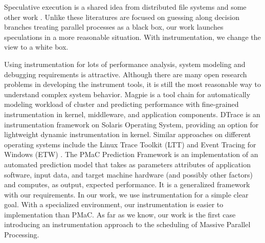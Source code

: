 Speculative execution is a shared idea from distributed file systems
\cite{Nightingale:2006:SED:1189256.1189258} and some other work
\cite{Su:2007:AIC:1294261.1294284} . Unlike these literatures are focused on guessing
along decision branches treating parallel processes as a black box, our work launches
speculations in a more reasonable situation. With instrumentation, we change the view to a
white box.

Using instrumentation for lots of performance analysis, system modeling and debugging
requirements is attractive. Although there are many open research problems in developing
the instrument tools, it is still the most reasonable way to understand complex system
behavior. Magpie \cite{Barham:2004:UMR:1251254.1251272} is a tool chain for automatically
modeling workload of cluster and predicting performance with fine-grained instrumentation
in kernel, middleware, and application components. DTrace
\cite{Cantrill:2004:DIP:1247415.1247417} is an instrumentation framework on Solaris
Operating System, providing an option for lightweight dynamic instrumentation in kernel.
Similar approaches on different operating systems include the Linux Trace Toolkit (LTT)
\cite{Yaghmour:2000:MCS:1267724.1267726} and Event Tracing for Windows (ETW) \cite{etw}.
The PMaC Prediction Framework \cite{Carrington:2006:PPF:1134241.1708446} is an
implementation of an automated prediction model that takes as parameters attributes of
application software, input data, and target machine hardware (and possibly other factors)
and computes, as output, expected performance. It is a generalized framework with our
requirements. In our work, we use instrumentation for a simple clear goal. With a
specialized environment, our instrumentation is easier to implementation than PMaC. As far
as we know, our work is the first case introducing an instrumentation approach to the
scheduling of Massive Parallel Processing.

